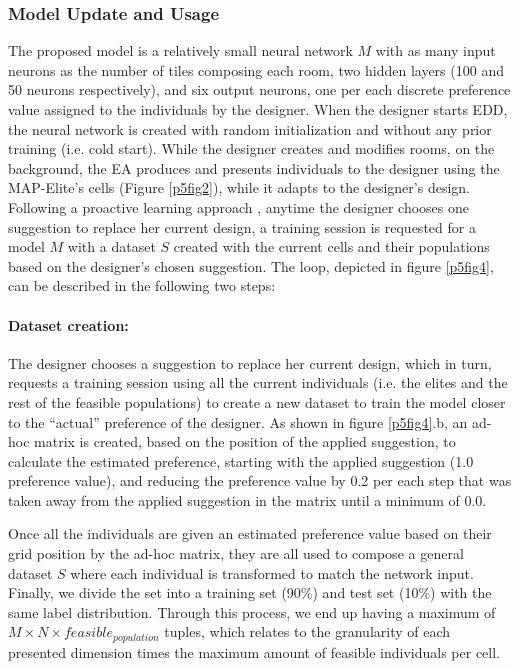 \subsubsection{Model Update and Usage}
The proposed model is a relatively small neural network $M$ with as many input neurons as the number of tiles composing each room, two hidden layers (100 and 50 neurons respectively), and six output neurons, one per each discrete preference value assigned to the individuals by the designer. When the designer starts EDD, the neural network is created with random initialization and without any prior training (i.e. cold start). While the designer creates and modifies rooms, on the background, the EA produces and presents individuals to the designer using the MAP-Elite’s cells (Figure \ref{p5fig2}), while it adapts to the designer’s design. Following a proactive learning approach , anytime the designer chooses one suggestion to replace her current design, a training session is requested for a model $M$ with a dataset $S$ created with the current cells and their populations based on the designer’s chosen suggestion. The loop, depicted in figure \ref{p5fig4}, can be described in the following two steps:

\paragraph{Dataset creation:}

The designer chooses a suggestion to replace her current design, which in turn, requests a training session using all the current individuals (i.e. the elites and the rest of the feasible populations) to create a new dataset to train the model closer to the “actual” preference of the designer. As shown in figure \ref{p5fig4}.b, an ad-hoc matrix is created, based on the position of the applied suggestion, to calculate the estimated preference, starting with the applied suggestion (1.0 preference value), and reducing the preference value by 0.2 per each step that was taken away from the applied suggestion in the matrix until a minimum of 0.0. %

Once all the individuals are given an estimated preference value based on their grid position by the ad-hoc matrix, they are all used to compose a general dataset $S$ where each individual is transformed to match the network input. Finally, we divide the set into a training set (90\%) and test set (10\%) with the same label distribution. Through this process, we end up having a maximum of $M \times N \times feasible_{population}$ tuples, which relates to the granularity of each presented dimension times the maximum amount of feasible individuals per cell.

